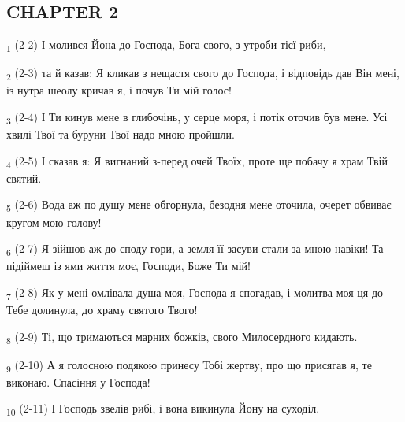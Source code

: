 \subsection{CHAPTER 2}
\begin{tcolorbox}
\textsubscript{1} (2-2) І молився Йона до Господа, Бога свого, з утроби тієї риби,
\end{tcolorbox}
\begin{tcolorbox}
\textsubscript{2} (2-3) та й казав: Я кликав з нещастя свого до Господа, і відповідь дав Він мені, із нутра шеолу кричав я, і почув Ти мій голос!
\end{tcolorbox}
\begin{tcolorbox}
\textsubscript{3} (2-4) І Ти кинув мене в глибочінь, у серце моря, і потік оточив був мене. Усі хвилі Твої та буруни Твої надо мною пройшли.
\end{tcolorbox}
\begin{tcolorbox}
\textsubscript{4} (2-5) І сказав я: Я вигнаний з-перед очей Твоїх, проте ще побачу я храм Твій святий.
\end{tcolorbox}
\begin{tcolorbox}
\textsubscript{5} (2-6) Вода аж по душу мене обгорнула, безодня мене оточила, очерет обвиває кругом мою голову!
\end{tcolorbox}
\begin{tcolorbox}
\textsubscript{6} (2-7) Я зійшов аж до споду гори, а земля її засуви стали за мною навіки! Та підіймеш із ями життя моє, Господи, Боже Ти мій!
\end{tcolorbox}
\begin{tcolorbox}
\textsubscript{7} (2-8) Як у мені омлівала душа моя, Господа я спогадав, і молитва моя ця до Тебе долинула, до храму святого Твого!
\end{tcolorbox}
\begin{tcolorbox}
\textsubscript{8} (2-9) Ті, що тримаються марних божків, свого Милосердного кидають.
\end{tcolorbox}
\begin{tcolorbox}
\textsubscript{9} (2-10) А я голосною подякою принесу Тобі жертву, про що присягав я, те виконаю. Спасіння у Господа!
\end{tcolorbox}
\begin{tcolorbox}
\textsubscript{10} (2-11) І Господь звелів рибі, і вона викинула Йону на суходіл.
\end{tcolorbox}

